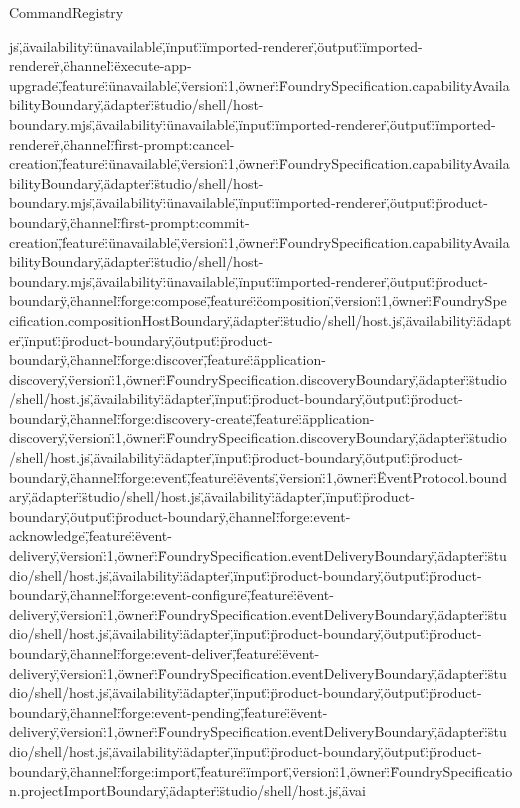 \begin{lexlean}{CommandRegistry}
\begin{semanticmodule}
{js\",\"availability\":\"unavailable\",\"input\":\"imported-renderer\",\"output\":\"imported-renderer\"},{\"channel\":\"execute-app-upgrade\",\"feature\":\"unavailable\",\"version\":1,\"owner\":\"FoundrySpecification.capabilityAvailabilityBoundary\",\"adapter\":\"studio/shell/host-boundary.mjs\",\"availability\":\"unavailable\",\"input\":\"imported-renderer\",\"output\":\"imported-renderer\"},{\"channel\":\"first-prompt:cancel-creation\",\"feature\":\"unavailable\",\"version\":1,\"owner\":\"FoundrySpecification.capabilityAvailabilityBoundary\",\"adapter\":\"studio/shell/host-boundary.mjs\",\"availability\":\"unavailable\",\"input\":\"imported-renderer\",\"output\":\"product-boundary\"},{\"channel\":\"first-prompt:commit-creation\",\"feature\":\"unavailable\",\"version\":1,\"owner\":\"FoundrySpecification.capabilityAvailabilityBoundary\",\"adapter\":\"studio/shell/host-boundary.mjs\",\"availability\":\"unavailable\",\"input\":\"imported-renderer\",\"output\":\"product-boundary\"},{\"channel\":\"forge:compose\",\"feature\":\"composition\",\"version\":1,\"owner\":\"FoundrySpecification.compositionHostBoundary\",\"adapter\":\"studio/shell/host.js\",\"availability\":\"adapter\",\"input\":\"product-boundary\",\"output\":\"product-boundary\"},{\"channel\":\"forge:discover\",\"feature\":\"application-discovery\",\"version\":1,\"owner\":\"FoundrySpecification.discoveryBoundary\",\"adapter\":\"studio/shell/host.js\",\"availability\":\"adapter\",\"input\":\"product-boundary\",\"output\":\"product-boundary\"},{\"channel\":\"forge:discovery-create\",\"feature\":\"application-discovery\",\"version\":1,\"owner\":\"FoundrySpecification.discoveryBoundary\",\"adapter\":\"studio/shell/host.js\",\"availability\":\"adapter\",\"input\":\"product-boundary\",\"output\":\"product-boundary\"},{\"channel\":\"forge:event\",\"feature\":\"events\",\"version\":1,\"owner\":\"EventProtocol.boundary\",\"adapter\":\"studio/shell/host.js\",\"availability\":\"adapter\",\"input\":\"product-boundary\",\"output\":\"product-boundary\"},{\"channel\":\"forge:event-acknowledge\",\"feature\":\"event-delivery\",\"version\":1,\"owner\":\"FoundrySpecification.eventDeliveryBoundary\",\"adapter\":\"studio/shell/host.js\",\"availability\":\"adapter\",\"input\":\"product-boundary\",\"output\":\"product-boundary\"},{\"channel\":\"forge:event-configure\",\"feature\":\"event-delivery\",\"version\":1,\"owner\":\"FoundrySpecification.eventDeliveryBoundary\",\"adapter\":\"studio/shell/host.js\",\"availability\":\"adapter\",\"input\":\"product-boundary\",\"output\":\"product-boundary\"},{\"channel\":\"forge:event-deliver\",\"feature\":\"event-delivery\",\"version\":1,\"owner\":\"FoundrySpecification.eventDeliveryBoundary\",\"adapter\":\"studio/shell/host.js\",\"availability\":\"adapter\",\"input\":\"product-boundary\",\"output\":\"product-boundary\"},{\"channel\":\"forge:event-pending\",\"feature\":\"event-delivery\",\"version\":1,\"owner\":\"FoundrySpecification.eventDeliveryBoundary\",\"adapter\":\"studio/shell/host.js\",\"availability\":\"adapter\",\"input\":\"product-boundary\",\"output\":\"product-boundary\"},{\"channel\":\"forge:import\",\"feature\":\"import\",\"version\":1,\"owner\":\"FoundrySpecification.projectImportBoundary\",\"adapter\":\"studio/shell/host.js\",\"avai}
\end{semanticmodule}
\end{lexlean}
